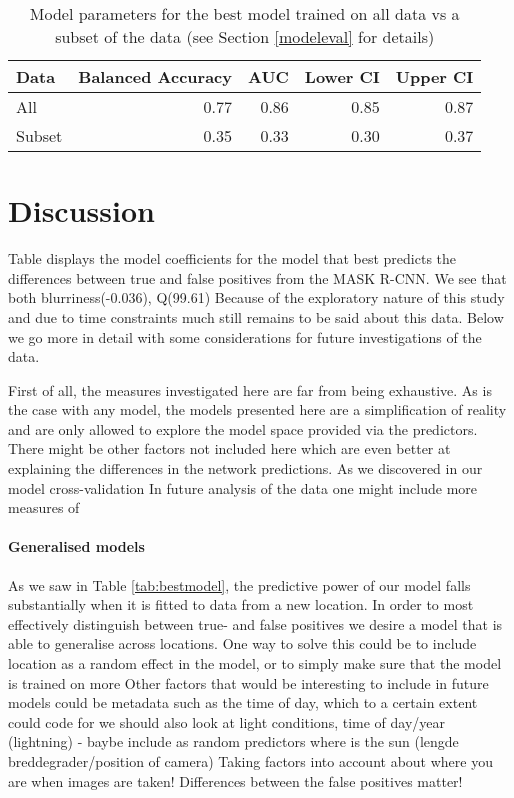 \documentclass[12pt]{article}
\begin{document}
\begin{table}[ht]
	\centering
	\caption{Model parameters for the best model trained on all data vs a subset of the data (see Section \ref{modeleval} for details)}
	\begin{tabular}{lrrrr}
	  \toprule
	Data & Balanced Accuracy & AUC & Lower CI & Upper CI \\ 
	  \midrule
	All & 0.77 & 0.86 & 0.85 & 0.87 \\
	Subset & 0.35 & 0.33 & 0.30 & 0.37 \\ 
	   \bottomrule
	\end{tabular}
	\label{tab:NarsvsThul}
\end{table}

\clearpage
\section{Discussion}
Table \label{tab:CVtopmodel} displays the model coefficients for the model that best predicts the differences between true and false positives from the MASK R-CNN. We see that both blurriness(-0.036), Q(99.61)
Because of the exploratory nature of this study and due to time constraints much still remains to be said about this data. Below we go more in detail with some considerations for future investigations of the data.

First of all, the measures investigated here are far from being exhaustive. As is the case with any model, the models presented here are a simplification of reality and are only allowed to explore the model space provided via the predictors. There might be other factors not included here which are even better at explaining the differences in the network predictions. As we discovered in our model cross-validation In future analysis of the data one might include more measures of

\paragraph{Generalised models}
As we saw in Table \ref{tab:bestmodel}, the predictive power of our model falls substantially when it is fitted to data from a new location. In order to most effectively distinguish between true- and false positives we desire a model that is able to generalise across locations. One way to solve this could be to include location as a random effect in the model, or to simply make sure that the model is trained on more
Other factors that would be interesting to include in future models could be metadata such as the time of day, which to a certain extent could code for 
we should also look at light conditions, time of day/year (lightning) - baybe include as random predictors
where is the sun (lengde breddegrader/position of camera)
Taking factors into account about where you are when images are taken!
Differences between the false positives matter!
\end{document}

